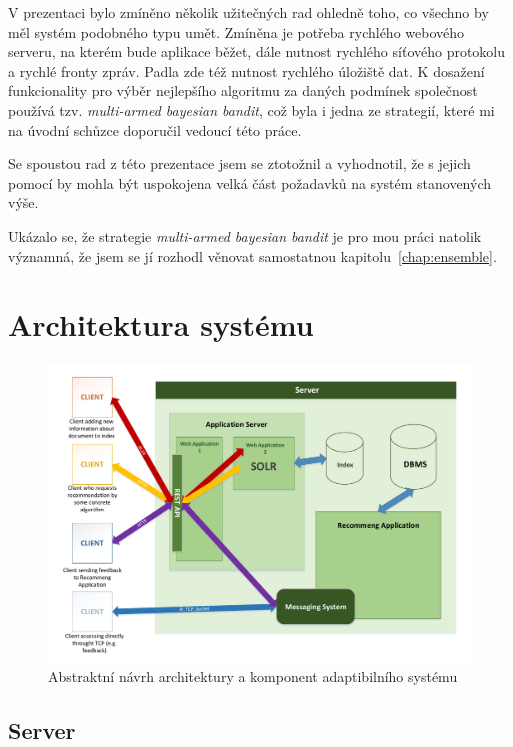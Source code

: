 \documentclass[thesis=M,czech]{FITthesis}[2014/05/07]
\begin{document}
V prezentaci bylo zmíněno několik užitečných rad ohledně toho, co všechno by měl systém podobného typu umět. Zmíněna je potřeba rychlého webového serveru, na kterém bude aplikace běžet, dále nutnost rychlého síťového protokolu a rychlé fronty zpráv. Padla zde též nutnost rychlého úložiště dat. K dosažení funkcionality pro výběr nejlepšího algoritmu za daných podmínek společnost používá tzv. \emph{multi-armed bayesian bandit}, což byla i jedna ze strategií, které mi na úvodní schůzce doporučil vedoucí této práce.

Se spoustou rad z této prezentace jsem se ztotožnil a vyhodnotil, že s jejich pomocí by mohla být uspokojena velká část požadavků na systém stanovených výše.

Ukázalo se, že strategie \emph{multi-armed bayesian bandit} je pro mou práci natolik významná, že jsem se jí rozhodl věnovat samostatnou kapitolu~\ref{chap:ensemble}.

\section{Architektura systému}

\begin{figure}\centering
	\includegraphics[width=1.0\textwidth]{obr/DIPLOMKA_env.pdf}
 	\caption[Abstraktní návrh architektury a komponent adaptibilního systému]{Abstraktní návrh architektury a komponent adaptibilního systému}\label{fig:longtail}
\end{figure}	

\subsection{Server}
\end{document}
